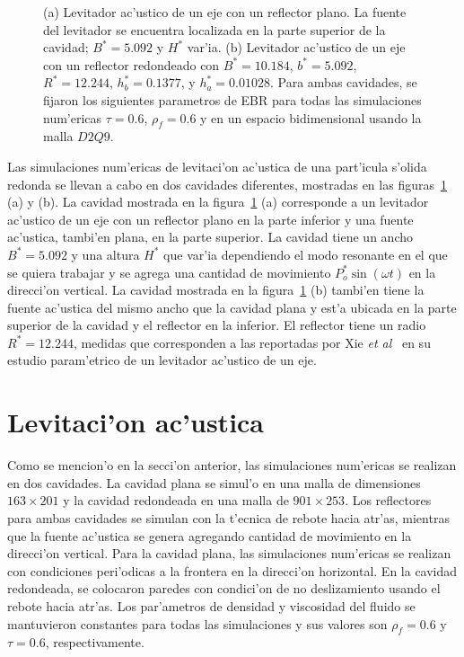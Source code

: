 \begin{figure}

\caption{\label{fig:cavidades}
(a) Levitador ac'ustico de un eje con un reflector plano. La fuente del levitador se encuentra
localizada en la parte superior de la cavidad; $B^\ast= 5.092$  y $H^\ast$ var'ia. (b) Levitador
ac'ustico de un eje con un reflector redondeado con $B^\ast=10.184$, $b^\ast=5.092$, $R^\ast=12.244$, $h_b^\ast =0.1377$, 
y $h_a^\ast=0.01028$. Para ambas cavidades, se fijaron los siguientes parametros de EBR para 
todas las simulaciones num'ericas $\tau=0.6$, $\rho_f=0.6$ y en un espacio bidimensional usando la malla $D2Q9$.}
\end{figure}

Las simulaciones num'ericas de levitaci'on ac'ustica de una part'icula s'olida redonda se llevan a cabo en dos
cavidades diferentes, mostradas en las figuras~\ref{fig:cavidades} (a) y (b). 
La cavidad mostrada en la figura~\ref{fig:cavidades} (a)
corresponde a un levitador ac'ustico de un eje con un reflector plano en la parte inferior y una fuente ac'ustica, 
tambi'en plana, en la parte superior. La cavidad  tiene un ancho $B^\ast=5.092$ y una altura $H^\ast$ 
que var'ia dependiendo el modo resonante en el que se quiera trabajar y se agrega una cantidad de 
movimiento $P_o^\ast \sin (\omega t)$ en la direcci'on vertical. 
La cavidad mostrada en la figura~\ref{fig:cavidades} (b) 
tambi'en tiene la fuente ac'ustica del mismo ancho que la cavidad plana y est'a ubicada 
en la parte superior  de la cavidad y el reflector en 
la inferior. El reflector tiene un radio $R^\ast = 12.244$, medidas que
corresponden a las reportadas por Xie {\it et al}~\cite{xie01} en su estudio param'etrico de 
un levitador ac'ustico de un eje. 
 

\section{Levitaci'on ac'ustica}
\label{sec:simulaciones}

Como se mencion'o en la secci'on anterior, las simulaciones num'ericas se realizan en dos
cavidades. La cavidad plana se simul'o en una malla de  dimensiones $163 \times 201$ y 
la cavidad redondeada en una malla de $901 \times 253$.
Los reflectores para ambas cavidades se simulan con la t'ecnica de rebote hacia atr'as, mientras que 
la fuente ac'ustica se genera agregando cantidad de movimiento en la direcci'on vertical. Para la cavidad
plana, las simulaciones num'ericas se realizan con condiciones peri'odicas a la frontera en la direcci'on
horizontal. En la cavidad redondeada, se colocaron paredes con condici'on de no deslizamiento usando el rebote
hacia atr'as. Los par'ametros de densidad y viscosidad del fluido se mantuvieron constantes para todas las simulaciones
y sus valores son $\rho_f=0.6$ y $\tau=0.6$, respectivamente. 

